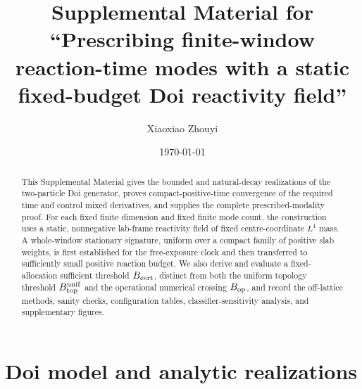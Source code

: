 \documentclass[aps,physrev,onecolumn,amsmath,amssymb,longbibliography]{revtex4-2}
\begin{document}
\title{Supplemental Material for ``Prescribing finite-window reaction-time
modes with a static fixed-budget Doi reactivity field''}

\author{Xiaoxiao Zhouyi}

\date{\today}

\begin{abstract}
This Supplemental Material gives the bounded and natural-decay realizations
of the two-particle Doi generator, proves compact-positive-time convergence
of the required time and control mixed derivatives, and supplies the complete
prescribed-modality proof.  For each fixed finite dimension and fixed finite
mode count, the construction uses a static, nonnegative lab-frame reactivity
field of fixed centre-coordinate \(L^1\) mass.  A whole-window stationary
signature, uniform over a compact family of positive slab weights, is first
established for the free-exposure clock and then transferred to sufficiently
small positive reaction budget.  We also derive and evaluate a fixed-allocation
sufficient threshold \(B_{\rm cert}\), distinct from both the
uniform topology threshold \(B_{\rm top}^{\rm unif}\) and the operational
numerical crossing \(B_{\rm op}\), and record the off-lattice methods,
sanity checks, configuration tables, classifier-sensitivity analysis, and
supplementary figures.
\end{abstract}

\maketitle

\section{Doi model and analytic realizations}
\label{sec:supp-model}
\end{document}
